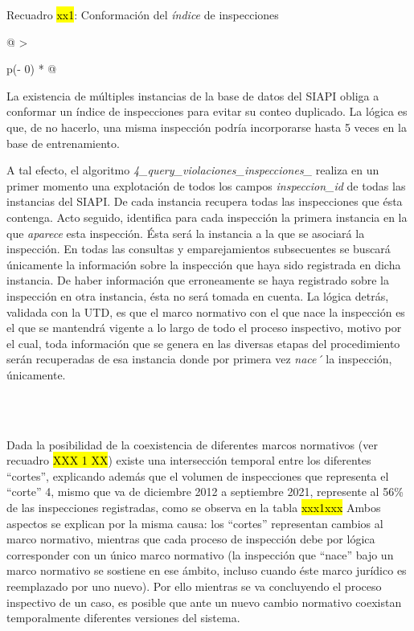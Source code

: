 \documentclass[
]{article}
\begin{document}
Recuadro \hl{xx1}: Conformación del \emph{índice} de inspecciones

\begin{longtable}[]{@{}
  >{\raggedright\arraybackslash}p{(\columnwidth - 0\tabcolsep) * }@{}}
\toprule\noalign{}
\begin{minipage}[b]{\linewidth}\raggedright
La existencia de múltiples instancias de la base de datos del SIAPI obliga a conformar un índice de inspecciones para evitar su conteo duplicado. La lógica es que, de no hacerlo, una misma inspección podría incorporarse hasta 5 veces en la base de entrenamiento.

A tal efecto, el algoritmo \emph{4\_query\_violaciones\_inspecciones\_} realiza en un primer momento una explotación de todos los campos \emph{inspeccion\_id} de todas las instancias del SIAPI. De cada instancia recupera todas las inspecciones que ésta contenga. Acto seguido, identifica para cada inspección la primera instancia en la que \emph{aparece} esta inspección. Ésta será la instancia a la que se asociará la inspección. En todas las consultas y emparejamientos subsecuentes se buscará únicamente la información sobre la inspección que haya sido registrada en dicha instancia. De haber información que erroneamente se haya registrado sobre la inspección en otra instancia, ésta no será tomada en cuenta. La lógica detrás, validada con la UTD, es que el marco normativo con el que nace la inspección es el que se mantendrá vigente a lo largo de todo el proceso inspectivo, motivo por el cual, toda información que se genera en las diversas etapas del procedimiento serán recuperadas de esa instancia donde por primera vez \emph{nace´} la inspección, únicamente.
\end{minipage} \\
\midrule\noalign{}
\endhead
\bottomrule\noalign{}
\endlastfoot
 \\
\end{longtable}

Dada la posibilidad de la coexistencia de diferentes marcos normativos (ver recuadro \hl{XXX 1 XX}) existe una intersección temporal entre los diferentes ``cortes'', explicando además que el volumen de inspecciones que representa el ``corte'' 4, mismo que va de diciembre 2012 a septiembre 2021, represente al 56\% de las inspecciones registradas, como se observa en la tabla \hl{xxx1xxx} Ambos aspectos se explican por la misma causa: los ``cortes'' representan cambios al marco normativo, mientras que cada proceso de inspección debe por lógica corresponder con un único marco normativo (la inspección que ``nace'' bajo un marco normativo se sostiene en ese ámbito, incluso cuando éste marco jurídico es reemplazado por uno nuevo). Por ello mientras se va concluyendo el proceso inspectivo de un caso, es posible que ante un nuevo cambio normativo coexistan temporalmente diferentes versiones del sistema.
\end{document}
